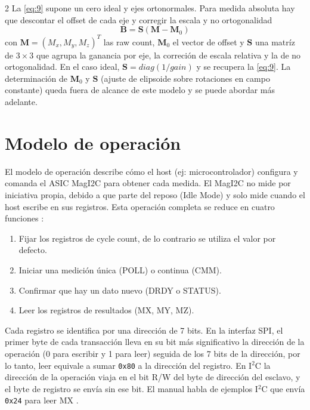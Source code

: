 \documentclass[11pt,letterpaper]{article}
\begin{document}
\begin{multicols*}{2}
La \cref{eq:9} supone un cero ideal y ejes ortonormales. Para medida absoluta hay que descontar el offset de cada eje y corregir la escala y no ortogonalidad
\begin{equation}
    \mathbf{B} = \mathbf{S}(\mathbf{M}-\mathbf{M}_0)
    \label{eq:12}
\end{equation}
con $\mathbf{M} = (M_x, M_y, M_z)^T$ las raw count, $\mathbf{M}_0$ el vector de offset y $\mathbf{S}$ una matríz de $3\times3$ que agrupa la ganancia por eje, la correción de escala relativa y la de no ortogonalidad. En el caso ideal, $\mathbf{S} = diag(1/gain)$ y se recupera la \cref{eq:9}. La determinación de $\mathbf{M}_0$  y $\mathbf{S}$ (ajuste de elipsoide sobre rotaciones en campo constante) queda fuera de alcance de este modelo y se puede abordar más adelante.

\section{Modelo de operación}
El modelo de operación describe cómo el host (ej: microcontrolador) configura y comanda el ASIC MagI2C para obtener cada medida. El MagI2C no mide por iniciativa propia, debido a que parte del reposo (Idle Mode) y solo mide cuando el host escribe en sus registros. Esta operación completa se reduce en cuatro funciones \citep{pni_manual}:
\begin{enumerate}
    \item Fijar los registros de cycle count, de lo contrario se utiliza el valor por defecto.
    \item Iniciar una medición única (POLL) o continua (CMM).
    \item Confirmar que hay un dato nuevo (DRDY o STATUS).
    \item Leer los registros de resultados (MX, MY, MZ).
\end{enumerate}
Cada registro se identifica por una dirección de 7 bits. En la interfaz SPI, el primer byte de cada transacción lleva en su bit más significativo la dirección de la operación (0 para escribir y 1 para leer) seguida de los 7 bits de la dirección, por lo tanto, leer equivale a sumar \verb|0x80| a la dirección del registro. En I$^2$C la dirección de la operación viaja en el bit R/W del byte de dirección del esclavo, y el byte de registro se envía sin ese bit. El manual habla de ejemplos I$^2$C que envía \verb|0x24| para leer MX \citep{pni_manual}.


\end{multicols*}
\end{document}
